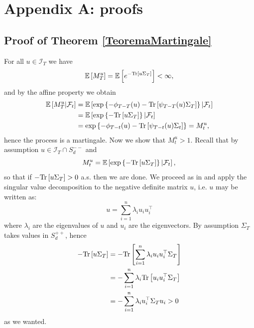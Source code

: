 

\section*{Appendix A: proofs}

\subsection*{Proof of Theorem \ref{TeoremaMartingale}}
For all $ u \in \mathcal{I}_{T}$ we have
\begin{equation}
\mathbb{E}\left[ M^{u}_{T}\right]=\mathbb{E}\left[e^{-\textup{Tr}\left[ u\Sigma_{T}\right]} \right]<\infty,\nonumber
\end{equation}
and by the affine property we obtain
\begin{align}
\mathbb{E}\left[ M^{u}_{T}|\mathcal{F}_{t}\right]&=\mathbb{E}\left[ \exp\left\{-\phi_{T-T}(u)-\textup{Tr}\left[\psi_{T-T}(u)\Sigma_{T} \right]\right\}|\mathcal{F}_{t}\right]\nonumber\\
&=\mathbb{E}\left[\exp\left\{-\textup{Tr}\left[u\Sigma_{T} \right] \right\} |\mathcal{F}_{t}\right]\nonumber\\
&=\exp\left\{ -\phi_{T-t}(u)-\textup{Tr}\left[ \psi_{T-t}(u)\Sigma_{t}\right]\right\}=M^{u}_{t},\nonumber
\end{align}
hence the process is a martingale. Now we show that $M_{t}^{u}>1$. Recall that by assumption $u\in \mathcal{I}_{T}\cap S_{d}^{--}$ and 
\begin{equation}
M^{u}_{t}=\mathbb{E}\left[\exp\left\{-\textup{Tr}\left[u\Sigma_{T} \right] \right\} |\mathcal{F}_{t}\right],\nonumber\\
\end{equation}
so that if $-\textup{Tr}\left[u\Sigma_{T} \right]>0$ a.s. then we are done.
We proceed as in \cite{article_gou02} and apply the singular value decomposition to the negative definite matrix $u$, i.e. $u$ may be written as:
\begin{equation}
u=\sum_{i=1}^{n}{\lambda_{i}u_{i}u_{i}^{\top}}\nonumber
\end{equation}
where $\lambda_{i}$ are the eigenvalues of $u$ and $u_i$ are the eigenvectors. By assumption $\Sigma_{T}$ takes values in $S_{d}^{++}$, hence
\begin{align}
-\textup{Tr}\left[u\Sigma_{T} \right]&= -\textup{Tr}\left[ \sum_{i=1}^{n}{\lambda_{i}u_{i}u_{i}^{\top}} \Sigma_{T}\right] \nonumber\\
&=-\sum_{i=1}^{n}{\lambda_{i} \textup{Tr}\left[u_{i}u_{i}^{\top}\Sigma_{T}\right]} \nonumber\\
&=-\sum_{i=1}^{n}{\lambda_{i}u_{i}^{\top}\Sigma_{T}u_{i}}>0 
\end{align}
as we wanted.\endproof







